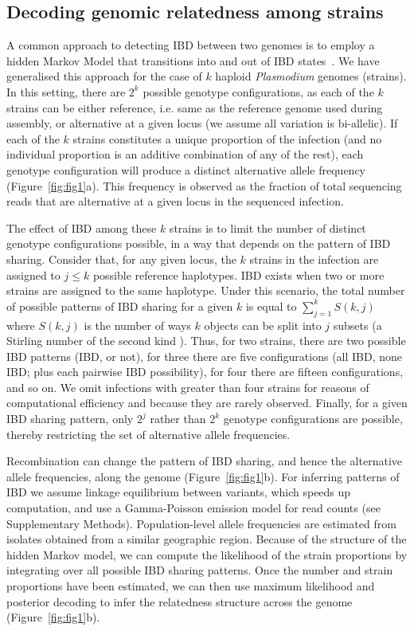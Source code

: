 \documentclass[9pt,lineno]{elife}
\begin{document}
\subsection{Decoding genomic relatedness among strains}

A common approach to detecting IBD between two genomes is to employ a hidden Markov Model that transitions into and out of IBD states~\citep{Chang2015, Gusev2009, Gusev2011}.  We have generalised this approach for the case of $k$ haploid {\it Plasmodium} genomes (strains). In this setting, there are $2^k$ possible genotype configurations, as each of the $k$ strains can be either reference, i.e. same as the reference genome used during assembly, or alternative at a given locus (we assume all variation is bi-allelic). If each of the $k$ strains constitutes a unique proportion of the infection (and no individual proportion is an additive combination of any of the rest), each genotype configuration will produce a distinct alternative allele frequency (Figure~\ref{fig:fig1}a). This frequency is observed as the fraction of total sequencing reads that are alternative at a given locus in the sequenced infection.

The effect of IBD among these $k$ strains is to limit the number of distinct genotype configurations possible, in a way that depends on the pattern of IBD sharing. Consider that, for any given locus, the $k$ strains in the infection are assigned to $j \leq k$ possible reference haplotypes. IBD exists when two or more strains are assigned to the same haplotype. Under this scenario, the total number of possible patterns of IBD sharing for a given $k$ is equal to $\sum_{j=1}^{k} S(k,j)$ where $S(k,j)$ is the number of ways $k$ objects can be split into $j$ subsets (a Stirling number of the second kind \citep{Ronald1988}). Thus, for two strains, there are two possible IBD patterns (IBD, or not), for three there are five configurations (all IBD, none IBD; plus each pairwise IBD possibility), for four there are fifteen configurations, and so on. We omit infections with greater than four strains for reasons of computational efficiency and because they are rarely observed. Finally, for a given IBD sharing pattern, only $2^j$ rather than $2^k$ genotype configurations are possible, thereby restricting the set of alternative allele frequencies.

Recombination can change the pattern of IBD sharing, and hence the alternative allele frequencies, along the genome (Figure~\ref{fig:fig1}b).  For inferring patterns of IBD we assume linkage equilibrium between variants, which speeds up computation, and use a Gamma-Poisson emission model for read counts (see Supplementary Methods).  Population-level allele frequencies are estimated from isolates obtained from a similar geographic region.  Because of the structure of the hidden Markov model, we can compute the likelihood of the strain proportions by integrating over all possible IBD sharing patterns.  Once the number and strain proportions have been estimated, we can then use maximum likelihood and posterior decoding to infer the relatedness structure across the genome (Figure~\ref{fig:fig1}b).
\end{document}

